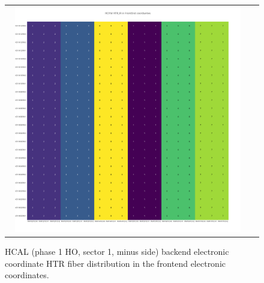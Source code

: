 \begin{figure}[htb]
 \begin{center}
  \begin{tabular}{cc}
   \includegraphics[angle=0,width=0.95\textwidth]{figures/appendix/HO1M_HTR_FI_in_FrontEnd.png}
  \end{tabular}
  \caption{HCAL (phase 1 HO, sector 1, minus side) backend electronic coordinate HTR fiber distribution in the frontend electronic coordinates.}
  \label{fig:lmapHO1MHTRFIFEC}
 \end{center}
\end{figure}
\clearpage

